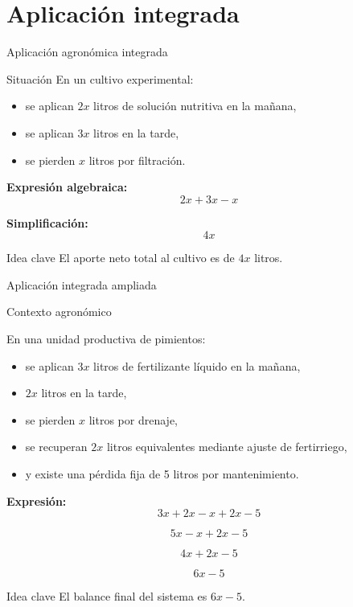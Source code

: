 \documentclass[handout,aspectratio=169,12pt]{beamer}
\newcommand{\IdeaClave}[1]{
	\begin{alertblock}{Idea clave}
		#1
	\end{alertblock}
}
\newcommand{\Agronomia}[1]{
	\begin{exampleblock}{Contexto agronómico}
		#1
	\end{exampleblock}
}
\begin{document}
	\section{Aplicación integrada}
	\begin{frame}{Aplicación agronómica integrada}
		\begin{block}{Situación}
			En un cultivo experimental:
			\begin{itemize}
				\item se aplican \(2x\) litros de solución nutritiva en la mañana,
				\pause
				\item se aplican \(3x\) litros en la tarde,
				\pause
				\item se pierden \(x\) litros por filtración.
			\end{itemize}
		\end{block}
		
		\pause
		\textbf{Expresión algebraica:}
		\[
		2x+3x-x
		\]
		
		\pause
		\textbf{Simplificación:}
		\[
		4x
		\]
		
		\pause
		\IdeaClave{El aporte neto total al cultivo es de \(4x\) litros.}
	\end{frame}
	
	\begin{frame}{Aplicación integrada ampliada}
		\small
		\Agronomia{
			En una unidad productiva de pimientos:
			\begin{itemize}
				\item se aplican \(3x\) litros de fertilizante líquido en la mañana,
				\pause
				\item \(2x\) litros en la tarde,
				\pause
				\item se pierden \(x\) litros por drenaje,
				\pause
				\item se recuperan \(2x\) litros equivalentes mediante ajuste de fertirriego,
				\pause
				\item y existe una pérdida fija de 5 litros por mantenimiento.
			\end{itemize}
		}
		
		\pause
		\textbf{Expresión:}
		\[
		3x+2x-x+2x-5
		\]
		
		\pause
		\[
		5x-x+2x-5
		\]
		
		\pause
		\[
		4x+2x-5
		\]
		
		\pause
		\[
		6x-5
		\]
		
		\pause
		\IdeaClave{El balance final del sistema es \(6x-5\).}
	\end{frame}
	
\end{document}
